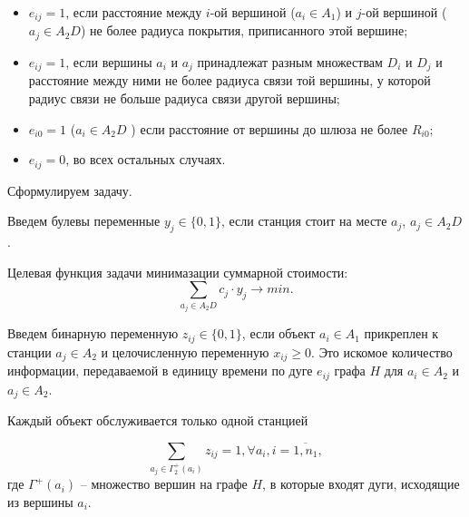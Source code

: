 \begin{itemize}
    \item $e_{ij} = 1$, если расстояние между $i$-ой вершиной ($a_i \in A_1$) и $j$-ой вершиной ($a_j \in A_2D$) не более радиуса покрытия, приписанного этой вершине;
    \item $e_{ij} = 1$, если вершины $a_i$ и $a_j$   принадлежат разным множествам $D_i$ и $D_j$ и расстояние между ними не более радиуса связи той вершины, у которой радиус связи не больше радиуса связи другой вершины;
    \item $e_{i0} = 1$ ($a_i \in A_2D$ ) если расстояние от вершины до шлюза не более $R_{i0}$;
    \item $e_{ij} = 0$, во всех остальных случаях.
\end{itemize}

Сформулируем задачу.

Введем булевы переменные $y_j \in \{0,1\}$, если станция стоит на месте $a_j$, $a_j \in A_2D$.

Целевая функция задачи минимазации суммарной стоимости:
\begin{equation}\label{eq:part2_1.10}
    \sum_{a_j \in A_2D} c_j \cdot y_j \to min.
\end{equation}

Введем бинарную переменную $z_{ij} \in \{0, 1\}$, если объект $a_i \in A_1$ прикреплен к станции $a_j  \in A_2$ и целочисленную переменную $x_{ij} \geqslant 0$. Это искомое количество информации, передаваемой в единицу времени по дуге $e_{ij}$ графа $H$ для $a_i  \in A_2$ и $a_j  \in A_2$.

Каждый объект обслуживается только одной станцией

\begin{equation}\label{eq:part2_1.5}
    \sum_{a_j \in \Gamma_2^+(a_i)} z_{ij} = 1, \forall a_i, i=\overline{1, n_1},
\end{equation}
где $\Gamma^+(a_i)$ – множество вершин на графе $H$, в которые входят дуги, исходящие из вершины $a_i$.



